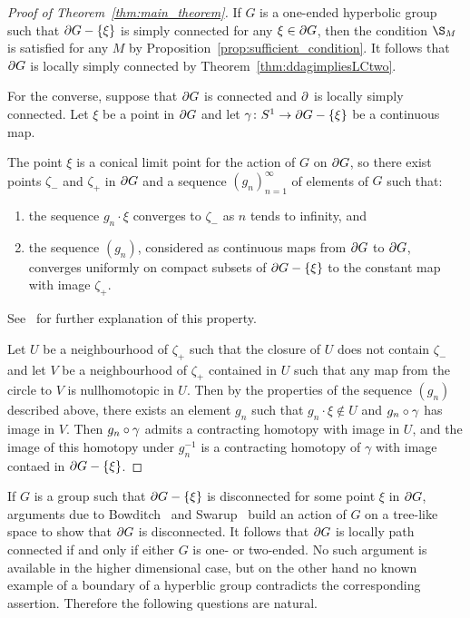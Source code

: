 \documentclass[a4paper]{article}
\begin{document}
\begin{proof}[Proof of Theorem~\ref{thm:main_theorem}]
  If $G$ is a one-ended hyperbolic group such that $\partial G - \left\{\xi\right\}$ is
  simply connected for any $\xi \in \partial G$, then the condition $\S_M$ is
  satisfied for any $M$ by Proposition~\ref{prop:sufficient_condition}. It
  follows that $\partial G$ is locally simply connected by
  Theorem~\ref{thm:ddagimpliesLCtwo}.

  For the converse, suppose that $\partial G$ is connected and $\partial$ 
  is locally simply connected. Let $\xi$ be a point in $\partial G$ and let
  $\gamma\colon S^1\to\partial G - \left\{\xi\right\}$ be a continuous map. 

  The point $\xi$ is a conical limit point for the action of $G$ on $\partial
  G$, so there exist points $\zeta_-$ and $\zeta_+$ in $\partial G$ and a
  sequence $(g_n)_{n = 1}^\infty$ of elements of $G$ such that:
  \begin{enumerate}
    \item the sequence $g_n\cdot\xi$ converges to $\zeta_-$ as $n$ tends to
      infinity, and
    \item the sequence $(g_n)$, considered as continuous maps from $\partial
      G$ to $\partial G$, converges uniformly on compact subsets of $\partial
      G - \left\{\xi\right\}$ to the constant map with image $\zeta_+$.
  \end{enumerate}
  See~\cite{bowditch99c} for further explanation of this property.

  Let $U$ be a neighbourhood of $\zeta_+$ such that the closure of $U$ does not
  contain $\zeta_-$ and let $V$ be a neighbourhood of $\zeta_+$ contained in
  $U$ such that any map from the circle to $V$ is nullhomotopic in $U$. Then by
  the properties of the sequence $(g_n)$ described above, there exists an
  element $g_n$ such that $g_n\cdot\xi \notin U$ and $g_n\circ\gamma$ has
  image in $V$. Then $g_n\circ\gamma$ admits a contracting homotopy with
  image in $U$, and the image of this homotopy under $g_n^{-1}$ is a
  contracting homotopy of $\gamma$ with image contaed in $\partial G -
  \left\{\xi\right\}$.
\end{proof}

If $G$ is a group such that $\partial G - \left\{\xi\right\}$ is disconnected for some
point $\xi$ in $\partial G$, arguments due to Bowditch~\cite{bowditch98b} and
Swarup~\cite{swarup96} build an action of $G$ on a tree-like space to show that
$\partial G$ is disconnected. It follows that $\partial G$ is locally path
connected if and only if either $G$ is one- or two-ended. No such argument is
available in the higher dimensional case, but on the other hand no known
example of a boundary of a hyperblic group contradicts the corresponding
assertion. Therefore the following questions are natural.
\end{document}
